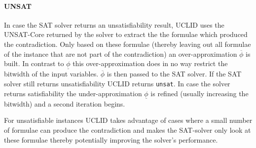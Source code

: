 \paragraph{UNSAT} In case the SAT solver returns an unsatisfiability result, \textsc{UCLID} uses the UNSAT-Core returned by the solver to extract the the formulae which produced the contradiction. Only based on these formulae (thereby leaving out all formulae of the instance that are not part of the contradiction) an over-approximation $\overline{\phi}$ is built. In contrast to $\underline{\phi}$ this over-approximation does in no way restrict the bitwidth of the input variables.  $\overline{\phi}$ is then passed to the SAT solver. If the SAT solver still returns unsatisfiability \textsc{UCLID} returns \texttt{unsat}. In case the solver returns satisfiability the under-approximation $\underline{\phi}$ is refined (usually increasing the bitwidth) and a second iteration begins.
\par
For unsatisfiable instances \textsc{UCLID} takes advantage of cases where a small number of formulae can produce the contradiction and makes the SAT-solver only look at these formulae thereby potentially improving the solver's performance.
